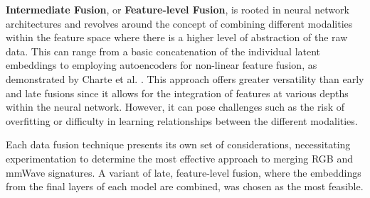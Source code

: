 \documentclass{mpaper}
\begin{document}
\textbf{Intermediate Fusion}, or \textbf{Feature-level Fusion}, is rooted in neural network architectures and revolves around the concept of combining different modalities within the feature space where there is a higher level of abstraction of the raw data. This can range from a basic concatenation of the individual latent embeddings to employing autoencoders for non-linear feature fusion, as demonstrated by Charte et al. \cite{charte2018practical}. This approach offers greater versatility than early and late fusions since it allows for the integration of features at various depths within the neural network. However, it can pose challenges such as the risk of overfitting or difficulty in learning relationships between the different modalities.

Each data fusion technique presents its own set of considerations, necessitating experimentation to determine the most effective approach to merging RGB and mmWave signatures. A variant of late, feature-level fusion, where the embeddings from the final layers of each model are combined, was chosen as the most feasible. 
\end{document}
